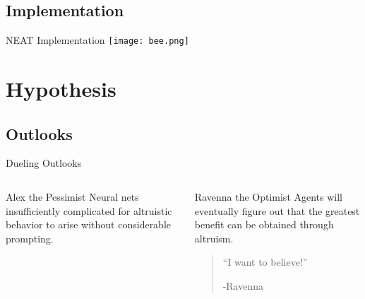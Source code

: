 \documentclass{beamer}
\begin{document}
    \subsection{Implementation}
    \begin{frame}{NEAT Implementation}
        \texttt{[image: bee.png]}
    \end{frame}

    \section{Hypothesis}


    \subsection{Outlooks}
    \begin{frame}{Dueling Outlooks}
        \begin{columns}[t]
                \begin{block}{Alex the Pessimist}
                        Neural nets insufficiently complicated for altruistic behavior to arise 
                        without considerable prompting.
                \end{block}
                \begin{block}{Ravenna the Optimist}
                        Agents will eventually figure out that the greatest benefit can be obtained 
                        through altruism.
                    \begin{quote}
                        ``I want to believe!''
                        \begin{flushright}
                            -Ravenna
                        \end{flushright} 
                    \end{quote}
                \end{block}
        \end{columns}
    \end{frame}
\end{document}
